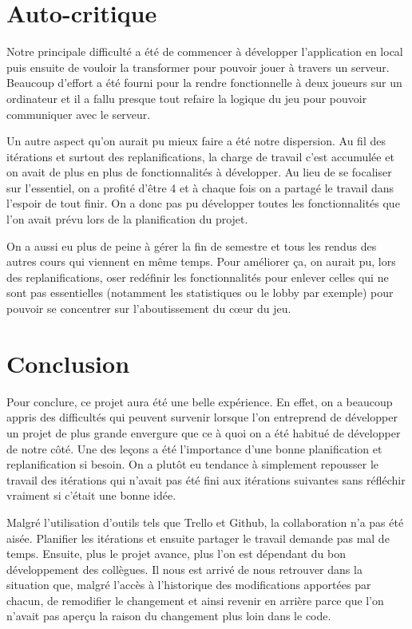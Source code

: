 \documentclass[a4paper,12pt]{article}
\begin{document}
	
	\section{Auto-critique}
	
	Notre principale difficulté a été de commencer à développer l'application en local puis ensuite de vouloir la transformer pour pouvoir jouer à travers un serveur. Beaucoup d'effort a été fourni pour la rendre fonctionnelle à deux joueurs sur un ordinateur et il a fallu presque tout refaire la logique du jeu pour pouvoir communiquer avec le serveur.
	
	Un autre aspect qu'on aurait pu mieux faire a été notre dispersion. Au fil des itérations et surtout des replanifications, la charge de travail c'est accumulée et on avait de plus en plus de fonctionnalités à développer. Au lieu de se focaliser sur l'essentiel, on a profité d'être 4 et à chaque fois on a partagé le travail dans l'espoir de tout finir. On a donc pas pu développer toutes les fonctionnalités que l'on avait prévu lors de la planification du projet.
	
	On a aussi eu plus de peine à gérer la fin de semestre et tous les rendus des autres cours qui viennent en même temps. Pour améliorer ça, on aurait pu, lors des replanifications, oser redéfinir les fonctionnalités pour enlever celles qui ne sont pas essentielles (notamment les statistiques ou le lobby par exemple) pour pouvoir se concentrer sur l'aboutissement du cœur du jeu.
	
	
	\section{Conclusion}
	Pour conclure, ce projet aura été une belle expérience. En effet, on a beaucoup appris des difficultés qui peuvent survenir lorsque l'on entreprend de développer un projet de plus grande envergure que ce à quoi on a été habitué de développer de notre côté. Une des leçons a été l'importance d'une bonne planification et replanification si besoin. On a plutôt eu tendance à simplement repousser le travail des itérations qui n'avait pas été fini aux itérations suivantes sans réfléchir vraiment si c'était une bonne idée.
	
	Malgré l'utilisation d'outils tels que Trello et Github, la collaboration n'a pas été aisée. Planifier les itérations et ensuite partager le travail demande pas mal de temps. Ensuite, plus le projet avance, plus l'on est dépendant du bon développement des collègues. Il nous est arrivé de nous retrouver dans la situation que, malgré l'accès à l'historique des modifications apportées par chacun, de remodifier le changement et ainsi revenir en arrière parce que l'on n’avait pas aperçu la raison du changement plus loin dans le code.
	
\end{document}
